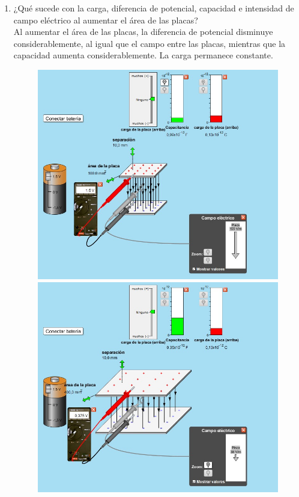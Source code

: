 \documentclass[12pt]{report}
\begin{document}
\begin{enumerate}
\begin{enumerate}
        
  \item ¿Qué sucede con la carga, diferencia de potencial, capacidad e intensidad de campo eléctrico al aumentar el área de las placas?\\[6pt]
            Al aumentar el área de las placas, la diferencia de potencial disminuye considerablemente, al igual que el campo entre las placas, mientras que la capacidad aumenta considerablemente. La carga permanece constante.\\

      \begin{figure}[h]
          \centering
          \begin{minipage}[h]{0.4\textwidth}
          \centering
          \includegraphics[width=1\textwidth]{./images/3foto1.jpg} 
          \end{minipage}\hfill
          \begin{minipage}[h]{0.4\textwidth}
          \centering
          \includegraphics[width=1\textwidth]{./images/3foto3.jpg} 

\end{minipage}
\end{figure}
\end{enumerate}
\end{enumerate}
\end{document}
